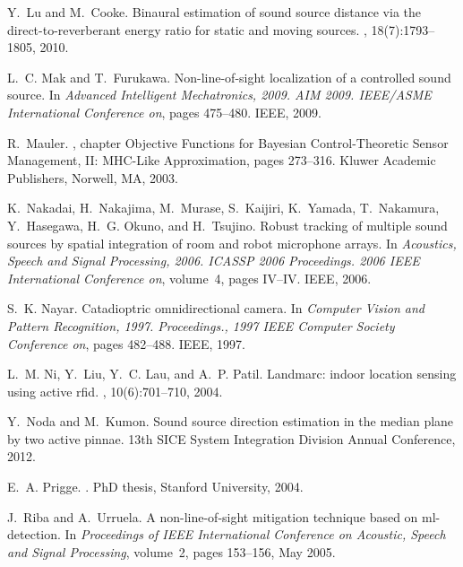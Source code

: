 \begin{thebibliography}{40}
Y.~Lu and M.~Cooke.
\newblock Binaural estimation of sound source distance via the
  direct-to-reverberant energy ratio for static and moving sources.
,
  18(7):1793--1805, 2010.

L.~C. Mak and T.~Furukawa.
\newblock Non-line-of-sight localization of a controlled sound source.
\newblock In {\em Advanced Intelligent Mechatronics, 2009. AIM 2009. IEEE/ASME
  International Conference on}, pages 475--480. IEEE, 2009.

R.~Mauler.
,
  chapter Objective Functions for Bayesian Control-Theoretic Sensor Management,
  II: MHC-Like Approximation, pages 273--316.
\newblock Kluwer Academic Publishers, Norwell, MA, 2003.

K.~Nakadai, H.~Nakajima, M.~Murase, S.~Kaijiri, K.~Yamada, T.~Nakamura,
  Y.~Hasegawa, H.~G. Okuno, and H.~Tsujino.
\newblock Robust tracking of multiple sound sources by spatial integration of
  room and robot microphone arrays.
\newblock In {\em Acoustics, Speech and Signal Processing, 2006. ICASSP 2006
  Proceedings. 2006 IEEE International Conference on}, volume~4, pages IV--IV.
  IEEE, 2006.

S.~K. Nayar.
\newblock Catadioptric omnidirectional camera.
\newblock In {\em Computer Vision and Pattern Recognition, 1997. Proceedings.,
  1997 IEEE Computer Society Conference on}, pages 482--488. IEEE, 1997.

L.~M. Ni, Y.~Liu, Y.~C. Lau, and A.~P. Patil.
\newblock Landmarc: indoor location sensing using active rfid.
, 10(6):701--710, 2004.

Y.~Noda and M.~Kumon.
\newblock Sound source direction estimation in the median plane by two active
  pinnae.
\newblock 13th SICE System Integration Division Annual Conference, 2012.

E.~A. Prigge.
.
\newblock PhD thesis, Stanford University, 2004.

J.~Riba and A.~Urruela.
\newblock A non-line-of-sight mitigation technique based on ml-detection.
\newblock In {\em Proceedings of IEEE International Conference on Acoustic,
  Speech and Signal Processing}, volume~2, pages 153--156, May 2005.


\end{thebibliography}
